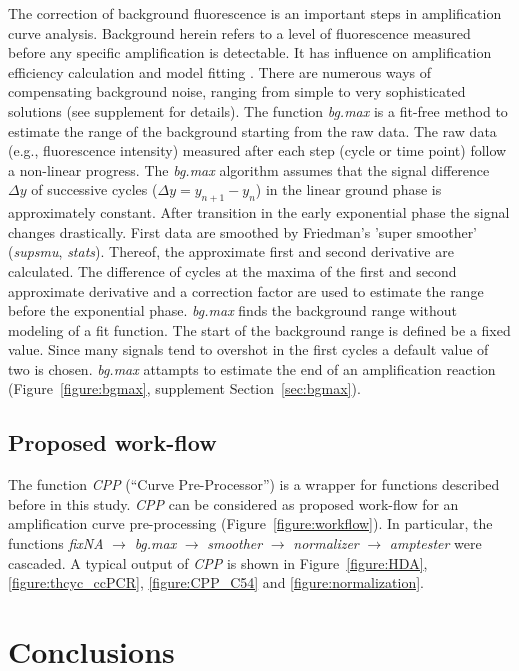 \documentclass[twocolumn]{bmcart}%
\begin{document}
  The correction of background fluorescence is an important steps in 
amplification curve analysis. Background herein refers to a level of 
fluorescence measured before any specific amplification is detectable. It has 
influence on amplification efficiency calculation and model fitting 
\cite{tuomi_2010, rutledge_2008, ruijter_2009}. There are numerous ways of 
compensating background noise, ranging from simple to very sophisticated 
solutions (see supplement for details). The function 
\textsl{bg.max} is a fit-free method to estimate the range of the background 
starting from the raw data. The raw data (e.g., fluorescence intensity) measured 
after each step (cycle or time point) follow a non-linear progress. The 
\textsl{bg.max} algorithm assumes that the signal difference $\Delta{y}$ of 
successive cycles ($\Delta{y} = y_{n + 1} - y_n$) in the linear ground phase is 
approximately constant. After transition in the early exponential phase the 
signal changes drastically. First data are smoothed by Friedman’s ’super 
smoother’ (\textsl{supsmu}, \emph{stats}). Thereof, the approximate first and 
second derivative are calculated. The difference of cycles at the maxima of the 
first and second approximate derivative and a correction factor are used to 
estimate the range before the exponential phase. \textsl{bg.max} finds the 
background range without modeling of a fit function. The start of the background 
range is defined be a fixed value. Since many signals tend to overshot in the 
first cycles a default value of two is chosen. \textsl{bg.max} attampts to 
estimate the end of an amplification reaction (Figure~\ref{figure:bgmax}, 
supplement Section~\ref{sec:bgmax}).

\subsection*{Proposed work-flow}

The function \textsl{CPP} (``Curve Pre-Processor'') is a wrapper for functions 
described before in this study. \textsl{CPP} can be considered as proposed 
work-flow for an amplification curve pre-processing 
(Figure~\ref{figure:workflow}). In particular, the functions \textsl{fixNA} 
$\rightarrow$ \textsl{bg.max} $\rightarrow$ \textsl{smoother} $\rightarrow$ 
\textsl{normalizer} $\rightarrow$ \textsl{amptester} were cascaded. A typical 
output of \textsl{CPP} is shown in Figure~\ref{figure:HDA}, 
\ref{figure:thcyc_ccPCR}, \ref{figure:CPP_C54} and \ref{figure:normalization}.

\section*{Conclusions}
\end{document}
